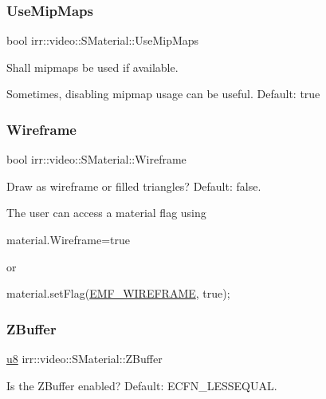 \subsubsection{\texorpdfstring{Use\+Mip\+Maps}{UseMipMaps}}
{\footnotesize\ttfamily bool irr\+::video\+::\+S\+Material\+::\+Use\+Mip\+Maps}



Shall mipmaps be used if available. 

Sometimes, disabling mipmap usage can be useful. Default\+: true \mbox{\label{classirr_1_1video_1_1SMaterial_a6fb428e6e27d0e143cc7da5ea19f8dcc}} 
\subsubsection{\texorpdfstring{Wireframe}{Wireframe}}
{\footnotesize\ttfamily bool irr\+::video\+::\+S\+Material\+::\+Wireframe}



Draw as wireframe or filled triangles? Default\+: false. 

The user can access a material flag using 
\begin{DoxyCode}
material.Wireframe=\textcolor{keyword}{true} 
\end{DoxyCode}
 or
\begin{DoxyCode}
material.setFlag(\hyperlink{namespaceirr_1_1video_a8a3bc00ae8137535b9fbc5f40add70d3abc620823efed8d6bdbd46c8a0180893a}{EMF\_WIREFRAME}, \textcolor{keyword}{true}); 
\end{DoxyCode}
 \mbox{\label{classirr_1_1video_1_1SMaterial_a7e604773b2ac61ab7a15ec9afef0dabf}} 
\subsubsection{\texorpdfstring{Z\+Buffer}{ZBuffer}}
{\footnotesize\ttfamily \hyperlink{namespaceirr_a646874f69af8ff87fc10201b0254a761}{u8} irr\+::video\+::\+S\+Material\+::\+Z\+Buffer}



Is the Z\+Buffer enabled? Default\+: E\+C\+F\+N\+\_\+\+L\+E\+S\+S\+E\+Q\+U\+AL. 

